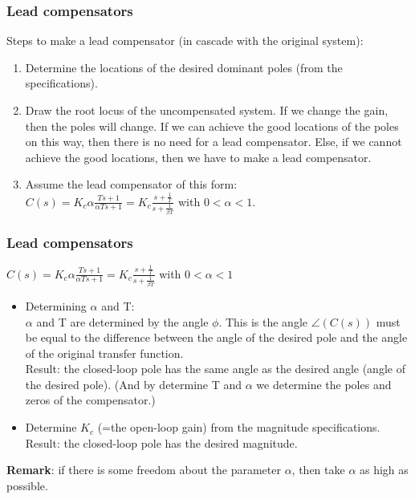 \begin{frame}
	\frametitle{Lead compensators}
	Steps to make a lead compensator (in cascade with the original system):
	\begin{enumerate}
		\item Determine the locations of the desired dominant poles (from the specifications).
		\item Draw the root locus of the uncompensated system. If we change the gain, then the poles will change. If we can achieve the good locations of the poles on this way, then there is no need for a lead compensator. Else, if we cannot achieve the good locations, then we have to make a lead compensator. 
		\item Assume the lead compensator of this form: \\
		$C(s)=K_c \alpha\frac{Ts+1}{\alpha Ts+1}= K_c\frac{s+\frac{1}{T}}{s+\frac{1}{\beta T}}$ with $0<\alpha<1$.
	\end{enumerate}
\end{frame}

\begin{frame}
	\frametitle{Lead compensators}
		$C(s)=K_c \alpha\frac{Ts+1}{\alpha Ts+1}= K_c\frac{s+\frac{1}{T}}{s+\frac{1}{\beta T}}$ with $0<\alpha<1$\\
		\begin{itemize}
			\item Determining $\alpha$ and T:\\
			$\alpha$ and T are determined by the angle $\phi$. This is the angle $\angle(C(s))$ must be equal to the difference between the angle of the desired pole and the angle of the original transfer function. \\
			Result: the closed-loop pole has the same angle as the desired angle (angle of the desired pole). (And by determine T and $\alpha$ we determine the poles and zeros of the compensator.)
			\item Determine $K_c$ (=the open-loop gain) from the magnitude specifications.\\
			Result: the closed-loop pole has the desired magnitude. 
		\end{itemize}
		\textbf{Remark}: if there is some freedom about the parameter $\alpha$, then take $\alpha$ as high as possible. 
\end{frame}

